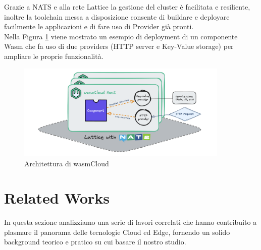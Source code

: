 Grazie a NATS e alla rete Lattice la gestione del cluster è facilitata e resiliente, inoltre la toolchain messa a disposizione consente di buildare e deployare facilmente le applicazioni e di fare uso di Provider già pronti.\\
Nella Figura \ref{fig:wasmcloud_arch} viene mostrato un esempio di deployment di un componente Wasm che fa uso di due providers (HTTP server e Key-Value storage) per ampliare le proprie funzionalità.

\FloatBarrier
\begin{figure}[h]
    \centering
    \includegraphics[width=0.9\textwidth]{img/wasmcloud-architecture.png}
    \caption{Architettura di wasmCloud\protect\footnotemark}
    \label{fig:wasmcloud_arch}
\end{figure}
\FloatBarrier
{}


\section{Related Works}

In questa sezione analizziamo una serie di lavori correlati che hanno contribuito a plasmare il panorama delle tecnologie Cloud ed Edge, fornendo un solido background teorico e pratico su cui basare il nostro studio.\\

